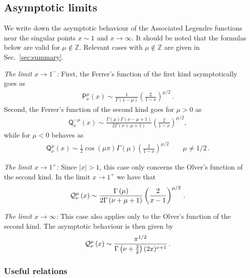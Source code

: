 \documentclass[a4paper,11pt]{article}
\numberwithin{equation}{section}
\begin{document}
\subsection{Asymptotic limits \label{sec:asymptotics}}
We write down the asymptotic behaviour of the Associated Legendre functions near the singular points $x\sim 1$ and $x\to \infty$. It should be noted that the formulas below are valid for $\mu\notin \mathbb{Z}$. Relevant cases with $\mu\notin \mathbb{Z}$ are given in Sec.~\ref{sec:summary}.

\textit{The limit $x\to 1^{-}$:} First, the Ferrer's function of the first kind asymptotically goes as
\begin{align}
\mathsf{P}^{\mu}_{\nu}\left(x\right)\sim\frac{1}{\Gamma\left(1-\mu\right)}%
\left(\frac{2}{1-x}\right)^{\mu/2}\,.
\end{align}
Second, the Ferrer's function of the second kind goes for $\mu>0$ as
\begin{align}
\mathsf{Q}^{-\mu}_{\nu}\left(x\right)\sim\frac{\Gamma\left(\mu\right)\Gamma%
\left(\nu-\mu+1\right)}{2\Gamma\left(\nu+\mu+1\right)}\left(\frac{2}{1-x}%
\right)^{\mu/2},
\end{align}
while for $\mu<0$ behaves as 
\begin{align}
\mathsf{Q}^{\mu}_{\nu}\left(x\right)\sim\frac{1}{2}\cos\left(\mu\pi\right)%
\Gamma\left(\mu\right)\left(\frac{2}{1-x}\right)^{\mu/2}\qquad {\mu\neq 1/2}\,.
\end{align}

\textit{The limit $x\to 1^{+}$:} Since $|x|>1$, this case only concerns the Olver's function of the second kind. In the limit $x\to 1^{+}$ we have that
\begin{align}
{\cal Q}^{\mu}_{\nu}\left(x\right)\sim\frac{\Gamma\left(\mu\right)}{2%
\Gamma\left(\nu+\mu+1\right)}\left(\frac{2}{x-1}\right)^{\mu/2}\,.
\end{align}

\textit{The limit $x\to \infty$:} This case also applies only to the Olver's function of the second kind. The asymptotic behaviour is then given by
\begin{align}
{\cal Q}^{\mu}_{\nu}\left(x\right)\sim\frac{\pi^{1/2}}{\Gamma\left(\nu+%
\frac{3}{2}\right)(2x)^{\nu+1}}\,.
\end{align}


\subsubsection{Useful relations}
\end{document}
